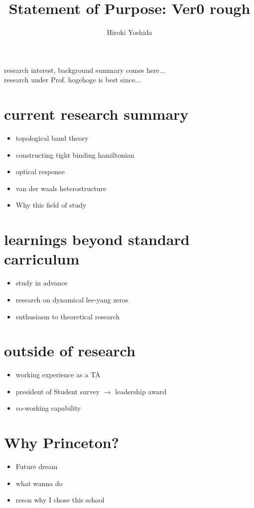 \documentclass[a4]{article}
\title{Statement of Purpose: Ver0 rough}
\author{Hiroki Yoshida}
\date{}
\begin{document}
\maketitle
research interest, background summary comes here...\\
research under Prof. hogehoge is best since...
\section{current research summary}
\begin{itemize}
  \item topological band theory
  \item constructing tight binding hamiltonian
  \item optical response
  \item van der waals heterostructure
  \item Why this field of study
\end{itemize}

\section{learnings beyond standard carriculum}
\begin{itemize}
  \item study in advance
  \item research on dynamical lee-yang zeros
  \item enthusiasm to theoretical research
\end{itemize}

\section{outside of research}
\begin{itemize}
  \item working experience as a TA
  \item president of Student survey $\rightarrow$ leadership award
  \item co-working capability
\end{itemize}

\section{Why Princeton?}
\begin{itemize}
  \item Future dream
  \item what wanna do
  \item reson why I chose this school
\end{itemize}
\end{document}
